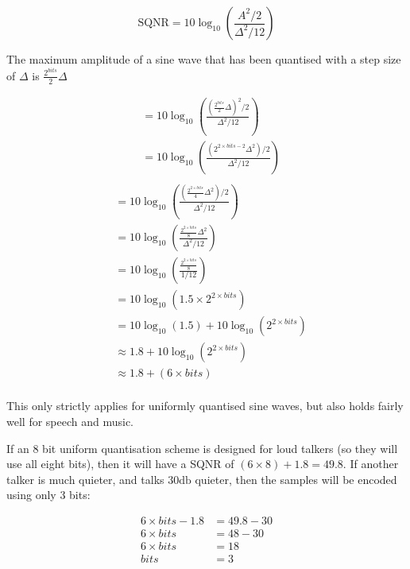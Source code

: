 \begin{mymulticols}
\[
  \text{SQNR} = 10\log_{10}\left(\frac{A^2 / 2}{\Delta^2 / 12}\right)
\]

The maximum amplitude of a sine wave that has been quantised with a step size
of $\Delta$ is $\frac{2^{bits}}{2}\Delta$

\allowdisplaybreaks
\begin{align*}
  &= 10\log_{10}\left(\frac{\left(\frac{2^{bits}}{2}\Delta\right)^2 / 2}{\Delta^2 / 12}\right)\\
  &= 10\log_{10}\left(\frac{\left(2^{2 \times bits - 2}\Delta^2\right) / 2}{\Delta^2 / 12}\right)\\
\end{align*}
\begin{align*}
  &= 10\log_{10}\left(\frac{\left(\frac{2^{2 \times bits}}{4}\Delta^2\right) / 2}{\Delta^2 / 12}\right)\\
  &= 10\log_{10}\left(\frac{\frac{2^{2 \times bits}}{8}\Delta^2}{\Delta^2 / 12}\right)\\
  &= 10\log_{10}\left(\frac{\frac{2^{2 \times bits}}{8}}{1 / 12}\right)\\
  &= 10\log_{10}(1.5 \times 2^{2 \times bits})\\
  &= 10\log_{10}(1.5) + 10\log_{10}(2^{2 \times bits})\\
  &\approx 1.8 + 10\log_{10}(2^{2 \times bits})\\
  &\approx 1.8 + (6 \times bits)\\
\end{align*}
\end{mymulticols}

This only strictly applies for uniformly quantised sine waves, but also holds
fairly well for speech and music.

If an 8 bit uniform quantisation scheme is designed for loud talkers (so they
will use all eight bits), then it will have a SQNR of $(6\times 8) + 1.8 =
49.8$. If another talker is much quieter, and talks $30\si{\decibel}$ quieter,
then the samples will be encoded using only $3$ bits:

\begin{align*}
  6 \times bits - 1.8 &= 49.8 - 30\\
  6 \times bits &= 48 - 30\\
  6 \times bits &= 18\\
  bits &= 3
\end{align*}


